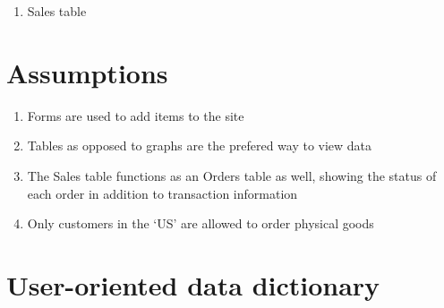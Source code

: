 \documentclass[11pt, a4paper]{report}
\begin{document}
\begin{enumerate}
\item Sales table
 
\end{enumerate}

\clearpage
\section{Assumptions}
\begin{enumerate}
\item Forms are used to add items to the site
\item Tables as opposed to graphs are the prefered way to view data
\item The Sales table functions as an Orders table as well, showing the status of each order in addition to transaction information
\item Only customers in the ‘US’ are allowed to order physical goods
\end{enumerate}

\clearpage
\section{User-oriented data dictionary}
\end{document}
